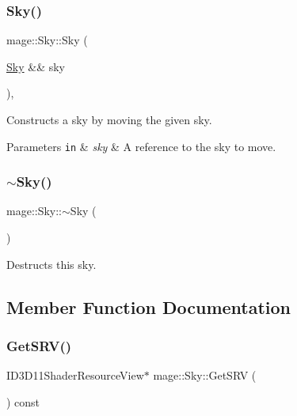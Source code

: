 \subsubsection{\texorpdfstring{Sky()}{Sky()}\hspace{0.1cm}{\footnotesize\ttfamily [3/3]}}
{\footnotesize\ttfamily mage\+::\+Sky\+::\+Sky (\begin{DoxyParamCaption}\item[{\hyperlink{classmage_1_1_sky}{Sky} \&\&}]{sky }\end{DoxyParamCaption})\hspace{0.3cm}{\ttfamily [default]}, {\ttfamily [noexcept]}}

Constructs a sky by moving the given sky.


\begin{DoxyParams}[1]{Parameters}
\mbox{\tt in}  & {\em sky} & A reference to the sky to move. \\
\hline
\end{DoxyParams}
\hypertarget{classmage_1_1_sky_a42c605bd010c1c6576c3ecf32cd0e962}{}\label{classmage_1_1_sky_a42c605bd010c1c6576c3ecf32cd0e962} 
\subsubsection{\texorpdfstring{$\sim$\+Sky()}{~Sky()}}
{\footnotesize\ttfamily mage\+::\+Sky\+::$\sim$\+Sky (\begin{DoxyParamCaption}{ }\end{DoxyParamCaption})\hspace{0.3cm}{\ttfamily [default]}}

Destructs this sky. 

\subsection{Member Function Documentation}
\hypertarget{classmage_1_1_sky_ae72817d4b5015b985234183b6474f5d6}{}\label{classmage_1_1_sky_ae72817d4b5015b985234183b6474f5d6} 
\subsubsection{\texorpdfstring{Get\+S\+R\+V()}{GetSRV()}}
{\footnotesize\ttfamily I\+D3\+D11\+Shader\+Resource\+View$\ast$ mage\+::\+Sky\+::\+Get\+S\+RV (\begin{DoxyParamCaption}{ }\end{DoxyParamCaption}) const\hspace{0.3cm}{\ttfamily [noexcept]}}

